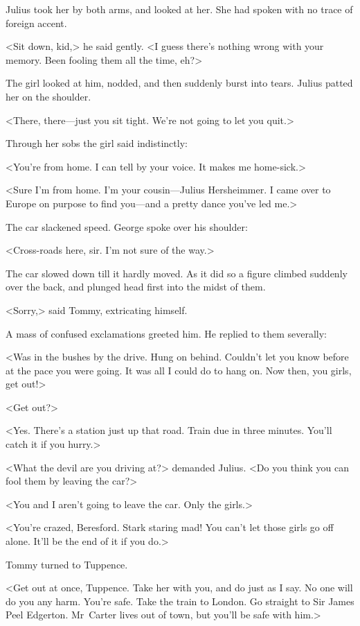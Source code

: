 Julius took her by both arms, and looked at her. She had spoken with no trace of foreign accent.

<Sit down, kid,> he said gently. <I guess there's nothing wrong with your memory. Been fooling them all the time, eh?>

The girl looked at him, nodded, and then suddenly burst into tears. Julius patted her on the shoulder.

<There, there—just you sit tight. We're not going to let you quit.>

Through her sobs the girl said indistinctly:

<You're from home. I can tell by your voice. It makes me home-sick.>

<Sure I'm from home. I'm your cousin—Julius Hersheimmer. I came over to Europe on purpose to find you—and a pretty dance you've led me.>

The car slackened speed. George spoke over his shoulder:

<Cross-roads here, sir. I'm not sure of the way.>

The car slowed down till it hardly moved. As it did so a figure climbed suddenly over the back, and plunged head first into the midst of them.

<Sorry,> said Tommy, extricating himself.

A mass of confused exclamations greeted him. He replied to them severally:

<Was in the bushes by the drive. Hung on behind. Couldn't let you know before at the pace you were going. It was all I could do to hang on. Now then, you girls, get out!>

<Get out?>

<Yes. There's a station just up that road. Train due in three minutes. You'll catch it if you hurry.>

<What the devil are you driving at?> demanded Julius. <Do you think you can fool them by leaving the car?>

<You and I aren't going to leave the car. Only the girls.>

<You're crazed, Beresford. Stark staring mad! You can't let those girls go off alone. It'll be the end of it if you do.>

Tommy turned to Tuppence.

<Get out at once, Tuppence. Take her with you, and do just as I say. No one will do you any harm. You're safe. Take the train to London. Go straight to Sir James Peel Edgerton. Mr~Carter lives out of town, but you'll be safe with him.>

